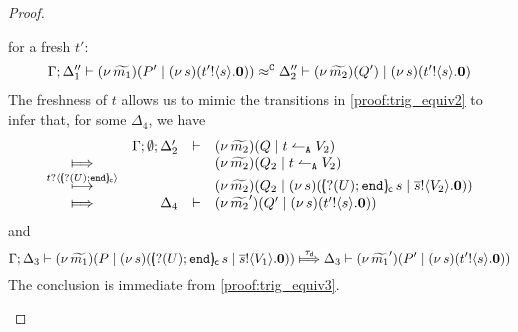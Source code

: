 \begin{proof}
\begin{enumerate}[1.]
\begin{enumerate}
							for a fresh $t'$:
							\begin{eqnarray}
								\Gamma; \Delta_1'' \vdash (\nu\, \widetilde{m_1})(P' \;|\; (\nu\, s)(t' ! \langle s \rangle . \mathbf{0}) ) \approx^\mathtt{C} \Delta_2'' \vdash (\nu\, \widetilde{m_2})(Q')  \;|\; (\nu\, s)(t' ! \langle s \rangle . \mathbf{0})
								\label{proof:trig_equiv3}
							\end{eqnarray}
							The freshness of $t$ allows us to mimic the transitions
							in \eqref{proof:trig_equiv2} to infer that, for some $\Delta_4$,
							we have
							\begin{eqnarray*}
								\begin{array}{crll}
									& \Gamma; \es; \Delta_2' & \proves &		
									\newsp{\widetilde{m_2}}{Q \Par \ntrigger{t}{V_2}}
									\\
									\Hby{} &&&
									\newsp{\widetilde{m_2}}{Q_2 \Par \ntrigger{t}{V_2}}
									\\
									{\hby{\bactinp{t}{\omapchar{\btinp{U} \tinact}}}}& & &
									\newsp{\widetilde{m_2}}{Q_2 \Par \newsp{s}{\appl{\omapchar{\btinp{U} \tinact}}{s} \Par \bout{\dual{s}}{V_2} \inact}}
									\\
									\Hby{} & \Delta_4 & \proves & \newsp{\widetilde{m_2}'}{Q' \Par \newsp{s}{\bout{t'}{s} \inact} }
								\end{array}
							\end{eqnarray*}
							and 
							\[
								\horel{\Gamma}{\Delta_3}{\newsp{\widetilde{m_1}}{P \Par \newsp{s}{ \appl{\omapchar{\btinp{U} \tinact}}{s} \Par \bout{\dual{s}}{V_1} \inact}}}
								{\Hby{\dtau}}
								{\Delta_3}{\newsp{\widetilde{m_1}'}{P' \Par \newsp{s}{ \bout{t'}{s} \inact}}}
							\]
							The conclusion is immediate from \eqref{proof:trig_equiv3}.


\end{enumerate}
\end{enumerate}
\end{proof}
